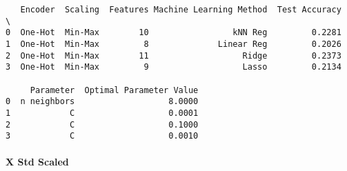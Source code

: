 \documentclass[11pt]{article}
\begin{document}
    
    \begin{verbatim}
   Encoder  Scaling  Features Machine Learning Method  Test Accuracy  \
0  One-Hot  Min-Max        10                 kNN Reg         0.2281   
1  One-Hot  Min-Max         8              Linear Reg         0.2026   
2  One-Hot  Min-Max        11                   Ridge         0.2373   
3  One-Hot  Min-Max         9                   Lasso         0.2134   

     Parameter  Optimal Parameter Value  
0  n neighbors                   8.0000  
1            C                   0.0001  
2            C                   0.1000  
3            C                   0.0010  
    \end{verbatim}

    
    \paragraph{X Std Scaled}\label{x-std-scaled}
\end{document}
